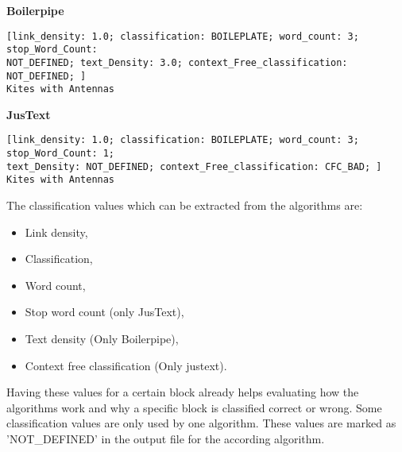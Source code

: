 \textbf{Boilerpipe}
\begin{lstlisting}
[link_density: 1.0; classification: BOILEPLATE; word_count: 3; stop_Word_Count: 
NOT_DEFINED; text_Density: 3.0; context_Free_classification: NOT_DEFINED; ]
Kites with Antennas
\end{lstlisting}


\textbf{JusText}
\begin{lstlisting}
[link_density: 1.0; classification: BOILEPLATE; word_count: 3; stop_Word_Count: 1; 
text_Density: NOT_DEFINED; context_Free_classification: CFC_BAD; ] 
Kites with Antennas
\end{lstlisting}

The classification values which can be extracted from the algorithms are:

\begin{itemize}
\item Link density,
\item Classification,
\item Word count,
\item Stop word count (only JusText),
\item Text density (Only Boilerpipe),
\item Context free classification (Only justext).
\end{itemize}

Having these values for a certain block already helps evaluating how the algorithms work and why a specific block is classified correct or wrong. Some classification values are only used by one algorithm. These values are marked as 'NOT\_DEFINED' in the output file for the according algorithm.
